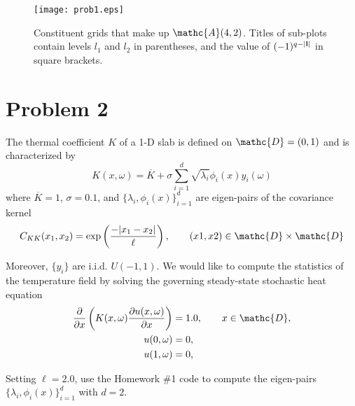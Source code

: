 \documentclass[11pt]{article}
\begin{document}
\begin{figure}[h]
\centering
\texttt{[image: prob1.eps]}
\caption{Constituent grids that make up $\mathc{A}(4,2)$. Titles of sub-plots contain levels $l_1$ and $l_2$ in parentheses, and the value of $(-1)^{q-|\mb{l}|}$ in square brackets.}
\label{fig:prob1}
\end{figure}

\section*{Problem 2} %

The thermal coefficient $K$ of a 1-D slab is defined on $\mathc{D} = (0,1)$ and is characterized by
\begin{equation}
K(x,\omega) = \overline{K} + \sigma \sum_{i=1}^d \sqrt{\lambda_i} \phi_i(x) y_i(\omega)
\end{equation}
where $\overline{K}=1$, $\sigma=0.1$, and $\{ \lambda_i, \phi_i(x) \}_{i=1}^d$ are eigen-pairs of the covariance kernel
\begin{equation}
C_{KK}(x_1,x_2) = \exp \left( \frac{- | x_1-x_2 | }{\ell} \right), \qquad (x1,x2) \in \mathc{D} \times \mathc{D}
\end{equation}

Moreover, $\{y_i\}$ are i.i.d. $U(-1,1)$. We would like to compute the statistics of the temperature field by solving the governing steady-state stochastic heat equation
\begin{equation}
\begin{aligned}
\pp{}{x} \left( K(x,\omega) \pp{u(x,\omega)}{x} \right) &= 1.0, \qquad x \in \mathc{D}, \\
u(0,\omega) &= 0, \\
u(1,\omega) &= 0,
\end{aligned}
\label{eq:pde}
\end{equation}

Setting $\ell = 2.0$, use the Homework \#1 code to compute the eigen-pairs $\{ \lambda_i, \phi_i(x) \}_{i=1}^d$ with $d=2$.
\end{document}
